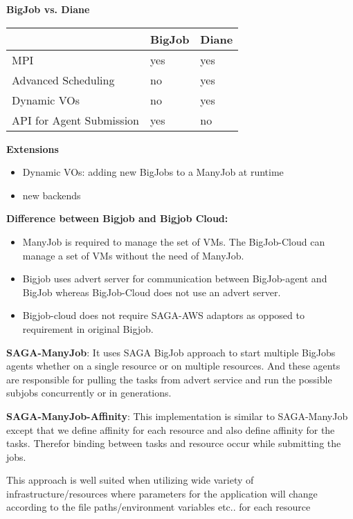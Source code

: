 \documentclass[]{article}
\begin{document}
\textbf{BigJob vs. Diane}

\begin{tabular}{|l|l|l|}
\hline
 &BigJob &Diane\\
\hline
MPI &yes &yes\\
\hline
Advanced Scheduling &no &yes\\
\hline
Dynamic VOs &no &yes\\
\hline
API for Agent Submission &yes &no\\
\hline
\end{tabular}





\textbf{Extensions}
\begin{itemize}
    \item Dynamic VOs: adding new BigJobs to a ManyJob at runtime
    \item new backends
\end{itemize}


\textbf{Difference between Bigjob and Bigjob Cloud:} 

\begin{itemize}
	\item ManyJob is required to manage the set of VMs. The BigJob-Cloud can manage a set of VMs without the need of ManyJob.
	\item Bigjob uses advert server for communication between BigJob-agent and BigJob whereas BigJob-Cloud does not use an advert server.
	\item Bigjob-cloud does not require SAGA-AWS adaptors as opposed to requirement in original Bigjob. 
\end{itemize}	




\textbf{SAGA-ManyJob}:
It uses SAGA BigJob approach to start multiple BigJobs agents 
whether on a single resource or on multiple resources. And 
these agents are responsible for pulling the tasks from advert 
service and run the possible subjobs concurrently or in generations.



\textbf{SAGA-ManyJob-Affinity}:
This implementation is similar to SAGA-ManyJob except that we define affinity for each resource and also define affinity for the tasks. Therefor binding between tasks and resource occur while submitting the jobs.

This approach is well suited when utilizing wide variety of infrastructure/resources where parameters for the application will change according to the file paths/environment variables etc.. for each resource
\end{document}
